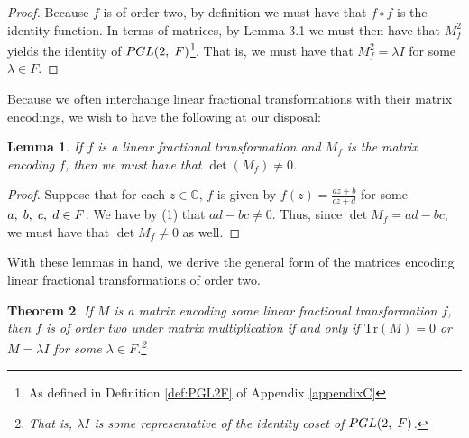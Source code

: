 \documentclass[12pt]{article}
\newcommand{\C}{\mathbb{C}}
\newcommand{\ttc}{, \hspace{1mm}}
\newcommand{\Tr}{\text{Tr}}
\theoremstyle{plain}
\newtheorem{theorem}{Theorem}[section]
\newtheorem{lemma}[theorem]{Lemma}
\theoremstyle{definition}
\begin{document}
\begin{proof}
	Because $f$ is of order two, by definition we must have that $f \circ f$ is the identity function. In terms of matrices, by Lemma 3.1 we must then have that $M_f^2$ yields the identity of $PGL(2\ttc F)$\footnote{As defined in Definition \ref{def:PGL2F} of Appendix \ref{appendixC}}. That is, we must have that $M_f^2 = \lambda I$ for some $\lambda \in F$.
\end{proof}

Because we often interchange linear fractional transformations with their matrix encodings, we wish to have the following at our disposal:

\begin{lemma}
	If $f$ is a linear fractional transformation and $M_f$ is the matrix encoding $f$, then we must have that $\det(M_f) \neq 0$.
\end{lemma}

\begin{proof}
	Suppose that for each $z \in \C$, $f$ is given by $f(z) = \frac{az+b}{cz+d}$ for some $a\ttc b\ttc c\ttc d \in F$. We have by (1) that $ad-bc \neq 0$. Thus, since $\det M_f = ad-bc$, we must have that $\det M_f \neq 0$ as well.
\end{proof}

With these lemmas in hand, we derive the general form of the matrices encoding linear fractional transformations of order two. 

\begin{theorem}
If $M$ is a matrix encoding some linear fractional transformation $f$, then $f$ is of order two under matrix multiplication if and only if $\Tr(M) = 0$ or $M = \lambda I$ for some $\lambda \in F$.\footnote{That is, $\lambda I$ is some representative of the identity coset of $PGL(2\ttc F)$.}
\end{theorem}
\end{document}
